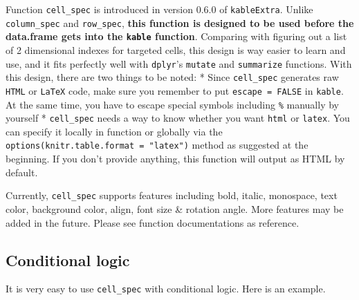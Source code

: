 \documentclass[table]{article}
\begin{document}
Function \texttt{cell\_spec} is introduced in version 0.6.0 of
\texttt{kableExtra}. Unlike \texttt{column\_spec} and
\texttt{row\_spec}, \textbf{this function is designed to be used before
the data.frame gets into the \texttt{kable} function}. Comparing with
figuring out a list of 2 dimensional indexes for targeted cells, this
design is way easier to learn and use, and it fits perfectly well with
\texttt{dplyr}'s \texttt{mutate} and \texttt{summarize} functions. With
this design, there are two things to be noted: * Since
\texttt{cell\_spec} generates raw \texttt{HTML} or \texttt{LaTeX} code,
make sure you remember to put \texttt{escape\ =\ FALSE} in
\texttt{kable}. At the same time, you have to escape special symbols
including \texttt{\%} manually by yourself * \texttt{cell\_spec} needs a
way to know whether you want \texttt{html} or \texttt{latex}. You can
specify it locally in function or globally via the
\texttt{options(knitr.table.format\ =\ "latex")} method as suggested at
the beginning. If you don't provide anything, this function will output
as HTML by default.

Currently, \texttt{cell\_spec} supports features including bold, italic,
monospace, text color, background color, align, font size \& rotation
angle. More features may be added in the future. Please see function
documentations as reference.

\hypertarget{conditional-logic}{%
\subsection{Conditional logic}\label{conditional-logic}}

It is very easy to use \texttt{cell\_spec} with conditional logic. Here
is an example.
\end{document}
